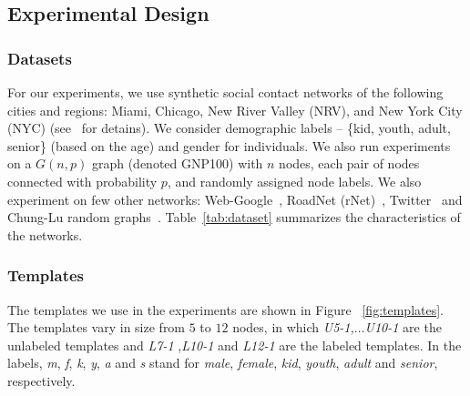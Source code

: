 \subsection{Experimental Design}
\label{sec:datasets-comp}

\subsubsection{Datasets}

For our experiments, we use synthetic social contact networks of the following
cities and regions: Miami, Chicago, New River Valley (NRV), and New York City
(NYC) (see~\cite{barrett2009generation} for detains). We consider demographic
labels -- \{kid, youth, adult, senior\} (based on the age) and gender for
individuals.  We also run experiments on a $G(n,p)$ graph (denoted GNP100) with
$n$ nodes, each pair of nodes connected with probability $p$, and randomly
assigned node labels. We also experiment on few other networks:
Web-Google~\cite{snap}, RoadNet (rNet)~\cite{snap}, Twitter~\cite{Kwak10www} and Chung-Lu random
graphs~\cite{chung2002connected}.  Table~\ref{tab:dataset} summarizes the
characteristics of the networks.

\begin{table}[hptb]
\caption{Networks used in the experiments}
\label{tab:dataset}
\end{table}

\subsubsection{Templates}
The templates we use in the experiments are shown in Figure
~\ref{fig:templates}. The templates vary in size from $5$ to $12$
nodes, in which \emph{U5-1,}$\ldots$\emph{U10-1} are the unlabeled templates
and \emph{L7-1} ,\emph{L10-1} and \emph{L12-1} are the labeled templates. In
the labels, \emph{m}, \emph{f}, \emph{k}, \emph{y}, \emph{a} and \emph{s} stand
for \emph{male}, \emph{female}, \emph{kid}, \emph{youth}, \emph{adult} and
\emph{senior}, respectively.

